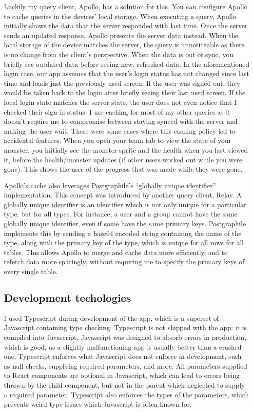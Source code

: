 \documentclass{l4proj}
\begin{document}
Luckily my query client, Apollo, has a solution for this. You can configure Apollo to cache queries in the devices' local storage. When executing a query, Apollo initially shows the data that the server responded with last time. Once the server sends an updated response, Apollo presents the server data instead. When the local storage of the device matches the server, the query is unnoticeable as there is no change from the client's perspective. When the data is out of sync, you briefly see outdated data before seeing new, refreshed data. In the aforementioned login case, our app assumes that the user's login status has not changed since last time and loads just the previously used screen. If the user was signed out, they would be taken back to the login after briefly seeing their last used screen. If the local login state matches the server state, the user does not even notice that I checked their sign-in status. I use caching for most of my other queries as it doesn't require me to compromise between staying synced with the server and making the user wait. There were some cases where this caching policy led to accidental features. When you open your team tab to view the state of your monster, you initially see the monster sprite and the health when you last viewed it, before the health/monster updates (if other users worked out while you were gone). This shows the user of the progress that was made while they were gone.

Apollo's cache also leverages Postgraphile's ``globally unique identifier'' implementation. This concept was introduced by another query client, Relay. A globally unique identifier is an identifier which is not only unique for a particular type, but for all types. For instance, a user and a group cannot have the same globally unique identifier, even if some have the same primary keys. Postgraphile implements this by sending a base64 encoded string containing the name of the type, along with the primary key of the type, which is unique for all rows for all tables. This allows Apollo to merge and cache data more efficiently, and to refetch data more sparingly, without requiring me to specify the primary keys of every single table.

\subsection{Development techologies}
I used Typescript during development of the app, which is a superset of Javascript containing type checking. Typescript is not shipped with the app: it is compiled into Javascript. Javascript was designed to absorb errors in production, which is good, as a slightly malfunctioning app is usually better than a crashed one. Typescript enforces what Javascript does not enforce in development, such as null checks, supplying required parameters, and more. All parameters supplied to React components are optional in Javascript, which can lead to errors being thrown by the child component, but not in the parent which neglected to supply a required parameter. Typescript also enforces the types of the parameters, which prevents weird type issues which Javascript is often known for.
\end{document}
